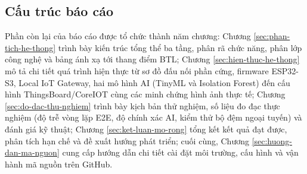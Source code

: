\subsection{Cấu trúc báo cáo}
\label{subsec:cau-truc-bao-cao}

Phần còn lại của báo cáo được tổ chức thành năm chương: Chương \ref{sec:phan-tich-he-thong} trình bày kiến trúc tổng thể ba tầng, phân rã chức năng, phân lớp công nghệ và bảng ánh xạ tới thang điểm BTL; Chương \ref{sec:hien-thuc-he-thong} mô tả chi tiết quá trình hiện thực từ sơ đồ đấu nối phần cứng, firmware ESP32-S3, Local IoT Gateway, hai mô hình AI (TinyML và Isolation Forest) đến cấu hình ThingsBoard/CoreIOT cùng các minh chứng hình ảnh thực tế; Chương \ref{sec:do-dac-thu-nghiem} trình bày kịch bản thử nghiệm, số liệu đo đạc thực nghiệm (độ trễ vòng lặp E2E, độ chính xác AI, kiểm thử bộ đệm ngoại tuyến) và đánh giá kỹ thuật; Chương \ref{sec:ket-luan-mo-rong} tổng kết kết quả đạt được, phân tích hạn chế và đề xuất hướng phát triển; cuối cùng, Chương \ref{sec:huong-dan-ma-nguon} cung cấp hướng dẫn chi tiết cài đặt môi trường, cấu hình và vận hành mã nguồn trên GitHub.
